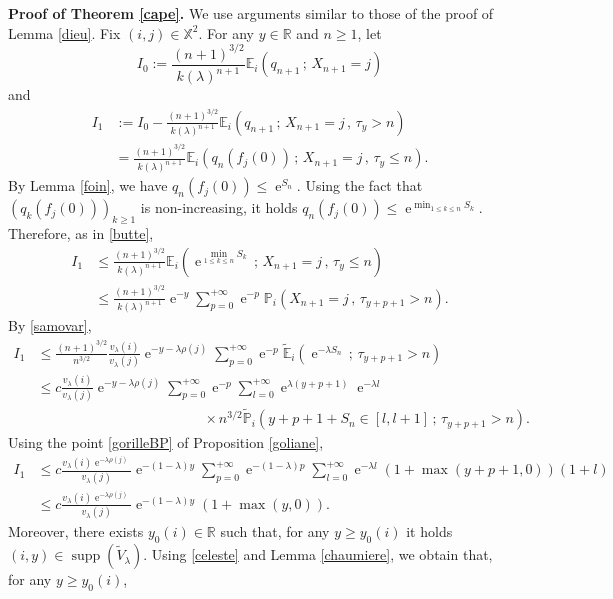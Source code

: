 \documentclass[12pt]{amsart}
\theoremstyle{definition}
\numberwithin{equation}{section}
\def\bb#1{\mathbb{#1}}
\def\tt#1{\tilde{#1}}
\def\tbb#1{\tilde{\mathbb{#1}}}
\def\geq{\geqslant}
\def\leq{\leqslant}
\renewcommand\ll{\lambda}
\DeclareMathOperator{\e}{e}
\DeclareMathOperator{\supp}{supp}
\begin{document}
\textbf{Proof of Theorem \ref{cape}.}
We use arguments similar to those of the proof of Lemma \ref{dieu}. 
Fix $(i,j) \in \bb X^2$. For any $y \in \bb R$ and $n \geq 1$, let
\[
I_0 := \frac{(n+1)^{3/2}}{k(\ll)^{n+1}} \bb E_i \left( q_{n+1} \,;\, X_{n+1} = j \right)
\]
and
\begin{align}
\label{celeste}
I_1 &:= I_0 - \frac{(n+1)^{3/2}}{k(\ll)^{n+1}} \bb E_i \left( q_{n+1} \,;\, X_{n+1} = j \,,\, \tau_y > n \right) \\
&=  \frac{(n+1)^{3/2}}{k(\ll)^{n+1}} \bb E_i \left( q_n\left( f_j(0) \right) \,;\, X_{n+1} = j \,,\, \tau_y \leq n \right). \nonumber
\end{align}
By Lemma \ref{foin}, we have $q_n\left( f_j(0) \right) \leq \e^{S_n}$. Using the fact that $\left( q_k\left( f_j(0) \right) \right)_{k\geq 1}$ is non-increasing, it holds $q_n\left( f_j(0) \right) \leq \e^{\min_{1\leq k \leq n} S_k}$. Therefore, as in
\eqref{butte},
\begin{align*}
	I_1 &\leq \frac{(n+1)^{3/2}}{k(\ll)^{n+1}} \bb E_i \left( \e^{\min_{1\leq k \leq n} S_k} \,;\, X_{n+1} = j \,,\, \tau_y \leq n \right) \\
	&\leq \frac{(n+1)^{3/2}}{k(\ll)^{n+1}} \e^{-y} \sum_{p=0}^{+\infty} \e^{-p} \bb P_i \left(  X_{n+1} = j \,,\, \tau_{y+p+1} > n \right).
\end{align*}
By \eqref{samovar},
\begin{align*}
	I_1 &\leq \frac{(n+1)^{3/2}}{n^{3/2}} \frac{v_{\ll}(i)}{v_{\ll}(j)} \e^{-y-\ll \rho(j)} \sum_{p=0}^{+\infty} \e^{-p} \tbb E_i \left( \e^{-\ll S_n} \,;\, \tau_{y+p+1} > n \right) \\
	&\leq c\frac{v_{\ll}(i)}{v_{\ll}(j)} \e^{-y-\ll \rho(j)} \sum_{p=0}^{+\infty} \e^{-p} \sum_{l=0}^{+\infty} \e^{\ll (y+p+1)} \e^{-\ll l} \\
	&\hspace{5cm} \times n^{3/2} \tbb P_i \left( y+p+1+S_n \in [l,l+1] \,;\, \tau_{y+p+1} > n \right).
\end{align*}
Using the point \ref{gorilleBP} of Proposition \ref{goliane},
\begin{align*}
I_1 &\leq c\frac{v_{\ll}(i)\e^{-\ll \rho(j)}}{v_{\ll}(j)} \e^{-(1-\ll)y} \sum_{p=0}^{+\infty} \e^{-(1-\ll)p} \sum_{l=0}^{+\infty} \e^{-\ll l} (1+\max(y+p+1,0))(1+l) \\
&\leq c\frac{v_{\ll}(i)\e^{-\ll \rho(j)}}{v_{\ll}(j)} \e^{-(1-\ll)y} (1+\max(y,0)).
\end{align*}
Moreover, there exists $y_0(i) \in \bb R$ such that, for any $y \geq y_0(i)$ it holds $(i,y) \in \supp \left( \tt V_{\ll} \right)$. Using \eqref{celeste} and Lemma \ref{chaumiere}, we obtain that, for any $y \geq y_0(i)$,
\end{document}
